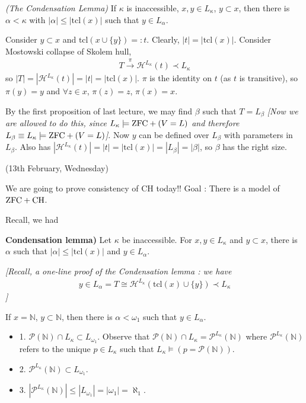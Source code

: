 \documentclass[12pt,a4paper]{article}
\newenvironment{proof}
{\begin{changemargin}{0.5cm}{0.5cm} 
	}%
	{\end{changemargin}
}
\renewenvironment{i}
{\begin{itemize} 
	}%
	{\end{itemize}
}
\newenvironment{p}
{\begin{proof} 
	}%
	{\end{proof}
}
\begin{document}
\thm \emph{(The Condensation Lemma)} If $\kappa$ is inaccessible, $x, y\in L_{\kappa}$, $y\subset x$, then there is $\alpha < \kappa$ with $|\alpha| \leq |\text{tcl}(x)|$ such that $y\in L_{\alpha}$.
\begin{p}
\pf Consider $y\subset x$ and $\text{tcl}(x\cup \{y\}) =:t$. Clearly, $|t| = |\text{tcl}(x)|$. Consider Mostowski collapse of Skolem hull,
\begin{align*}
T \xrightarrow{\pi} \mathcal{H}^{L_{\kappa}}(t) \prec L_{\kappa}
\end{align*}
so $|T| = |\mathcal{H}^{L_{\kappa}}(t)| = |t| = |\text{tcl}(x)|$. $\pi$ is the identity on $t$ (as $t$ is transitive), so $\pi(y)=y$ and $\forall z\in x$, $\pi(z) =z$, $\pi(x)=x$.

\quad By the first proposition of last lecture, we may find $\beta$ such that $T=L_{\beta}$ \emph{[Now we are allowed to do this, since $L_{\kappa} \models \text{ZFC} +(V=L)$ and therefore $L_{\beta} \equiv L_{\kappa} \models \text{ZFC}+(V=L)$]}. Now $y$ can be defined over $L_{\beta}$ with parameters in $L_{\beta}$. Also has $|\mathcal{H}^{L_{\kappa}}(t)| = |t| = |\text{tcl}(x)| = |L_{\beta}|= |\beta|$, so $\beta$ has the right size.

\eop
\end{p}
\s

\newday

(13th February, Wednesday)
\s

We are going to prove consistency of CH today!! Goal : There is a model of $\text{ZFC} + \text{CH}$.
\s

Recall, we had

\textbf{Condensation lemma)} Let $\kappa$ be inaccessible. For $x, y\in L_{\kappa}$ and $y\subset x$, there is $\alpha$ such that $|\alpha| \leq |\text{tcl}(x)|$ and $y\in L_{\alpha}$.
\s

\emph{[Recall, a one-line proof of the Condensation lemma : we have
\begin{align*}
y \in L_{\alpha} = T \cong \mathcal{H}^{L_{\kappa}}(\text{tcl}(x) \cup \{y\}) \prec L_{\kappa}
\end{align*}
]}
\s

 If $x= \mathbb{N}$, $y\subset \mathbb{N}$, then there is $\alpha < \omega_1$ such that $y\in L_{\alpha}$.
\s

\begin{i}
\item[1.] $\mathscr{P}(\mathbb{N}) \cap L_{\kappa} \subset L_{\omega_1}$. Observe that $\mathscr{P}(\mathbb{N}) \cap L_{\kappa} = \mathscr{P}^{L_{\kappa}} (\mathbb{N})$ where $\mathscr{P}^{L_{\kappa}} (\mathbb{N})$ refers to the unique $p\in L_{\kappa}$ such that $L_{\kappa} \models (p = \mathscr{P}(\mathbb{N}))$.
\item[2.] $\mathscr{P}^{L_{\kappa}} (\mathbb{N}) \subset L_{\omega_1}$.
\item[3.] $|\mathscr{P}^{L_{\kappa}} (\mathbb{N})| \leq |L_{\omega_1}| = |\omega_1| = \aleph_1$.
\end{i}
\s
\end{document}
